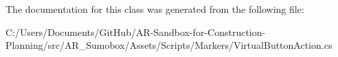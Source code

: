 The documentation for this class was generated from the following file\+:\begin{DoxyCompactItemize}
\item 
C\+:/\+Users/\+Documents/\+Git\+Hub/\+A\+R-\/\+Sandbox-\/for-\/\+Construction-\/\+Planning/src/\+A\+R\+\_\+\+Sumobox/\+Assets/\+Scripts/\+Markers/Virtual\+Button\+Action.\+cs\end{DoxyCompactItemize}
